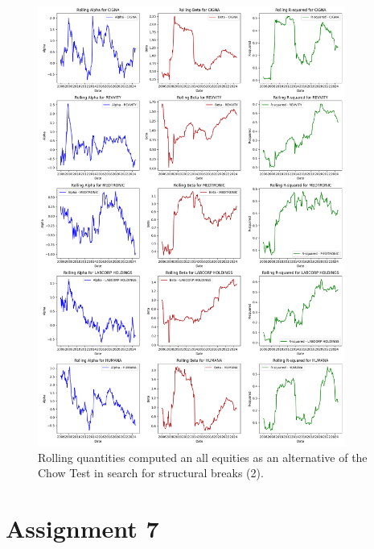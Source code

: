 \documentclass[12pt, openright, twoside]{report}
\begin{document}
\begin{figure}[h!]
    \centering
    \includegraphics[width=0.9\textwidth]{images/rolling_quantities_2.png}
    \caption{Rolling quantities computed an all equities as an alternative of the Chow Test in search for structural
    breaks (2).}\label{fig:rolling_quantities_2}
\end{figure}

\section*{Assignment 7}
\end{document}
